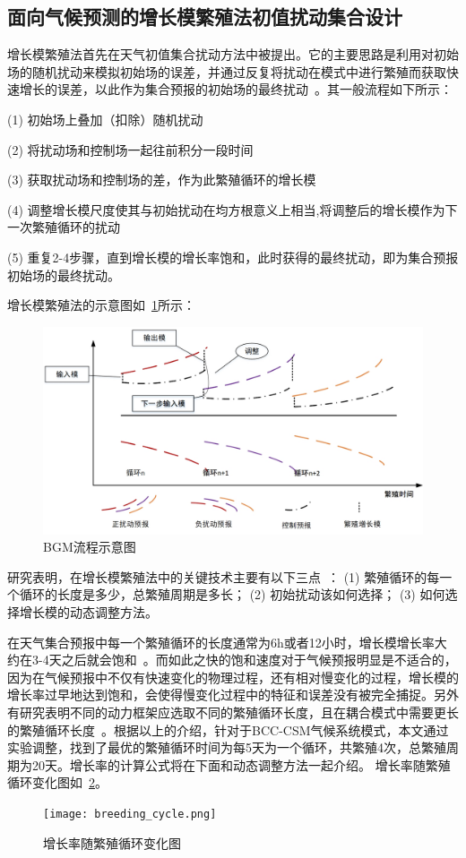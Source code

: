\subsection{面向气候预测的增长模繁殖法初值扰动集合设计}

增长模繁殖法首先在天气初值集合扰动方法中被提出。它的主要思路是利用对初始场的随机扰动来模拟初始场的误差，并通过反复将扰动在模式中进行繁殖而获取快速增长的误差，以此作为集合预报的初始场的最终扰动~\cite{toth1997ensemble}。其一般流程如下所示：

(1) 初始场上叠加（扣除）随机扰动

(2) 将扰动场和控制场一起往前积分一段时间

(3) 获取扰动场和控制场的差，作为此繁殖循环的增长模

(4) 调整增长模尺度使其与初始扰动在均方根意义上相当,将调整后的增长模作为下一次繁殖循环的扰动

(5) 重复2-4步骤，直到增长模的增长率饱和，此时获得的最终扰动，即为集合预报初始场的最终扰动。

增长模繁殖法的示意图如~\ref{fig:bgm}所示：
\begin{figure}[H] %
  \centering
  \includegraphics[scale=0.8]{figures/bgm.jpg}
  \caption{BGM流程示意图}
  \label{fig:bgm}
\end{figure}

研究表明，在增长模繁殖法中的关键技术主要有以下三点~\cite{郑峰2008集合预报初值扰动在天气预报中的应用研究进展}：
(1) 繁殖循环的每一个循环的长度是多少，总繁殖周期是多长；
(2) 初始扰动该如何选择；
(3) 如何选择增长模的动态调整方法。

在天气集合预报中每一个繁殖循环的长度通常为6h或者12小时，增长模增长率大约在3-4天之后就会饱和~\cite{toth1997ensemble,zhang2010beating}。而如此之快的饱和速度对于气候预报明显是不适合的，因为在气候预报中不仅有快速变化的物理过程，还有相对慢变化的过程，增长模的增长率过早地达到饱和，会使得慢变化过程中的特征和误差没有被完全捕捉。另外有研究表明不同的动力框架应选取不同的繁殖循环长度，且在耦合模式中需要更长的繁殖循环长度~\cite{yang2006enso,baehr2013ensemble}。根据以上的介绍，针对于BCC-CSM气候系统模式，本文通过实验调整，找到了最优的繁殖循环时间为每5天为一个循环，共繁殖4次，总繁殖周期为20天。增长率的计算公式将在下面和动态调整方法一起介绍。
增长率随繁殖循环变化图如~\ref{fig:bred cycle}。
\begin{figure}[H] %
  \centering
  \texttt{[image: breeding\_cycle.png]}
  \caption{增长率随繁殖循环变化图}
  \label{fig:bred cycle}
\end{figure}

